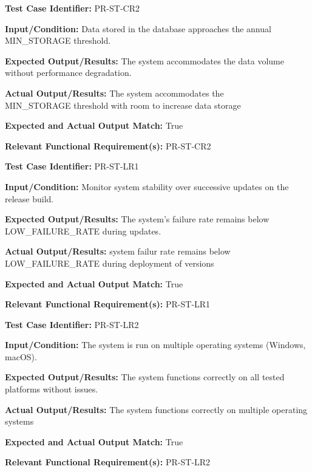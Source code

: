 \documentclass[12pt, titlepage]{article}
\begin{document}
\begin{mdframed}[linewidth=0.5mm]
  \textbf{Test Case Identifier:} PR-ST-CR2 \par
  \textbf{Input/Condition:} Data stored in the database approaches the annual MIN\_STORAGE threshold. \par
  \textbf{Expected Output/Results:} The system accommodates the data volume without performance degradation. \par
  \textbf{Actual Output/Results:} The system accommodates the \\MIN\_STORAGE threshold with room to increase data storage\par
  \textbf{Expected and Actual Output Match:} True \par
  \textbf{Relevant Functional Requirement(s):} PR-ST-CR2
\end{mdframed}

\begin{mdframed}[linewidth=0.5mm]
  \textbf{Test Case Identifier:} PR-ST-LR1 \par
  \textbf{Input/Condition:} Monitor system stability over successive updates on the release build. \par
  \textbf{Expected Output/Results:} The system’s failure rate remains below LOW\_FAILURE\_RATE during updates. \par
  \textbf{Actual Output/Results:} system failur rate remains below \\LOW\_FAILURE\_RATE during deployment of versions \par
  \textbf{Expected and Actual Output Match:} True \par
  \textbf{Relevant Functional Requirement(s):} PR-ST-LR1
\end{mdframed}

\begin{mdframed}[linewidth=0.5mm]
  \textbf{Test Case Identifier:} PR-ST-LR2 \par
  \textbf{Input/Condition:} The system is run on multiple operating systems (Windows, macOS). \par
  \textbf{Expected Output/Results:} The system functions correctly on all tested platforms without issues. \par
  \textbf{Actual Output/Results:} The system functions correctly on multiple operating systems\par
  \textbf{Expected and Actual Output Match:} True \par
  \textbf{Relevant Functional Requirement(s):} PR-ST-LR2
\end{mdframed}
\end{document}
